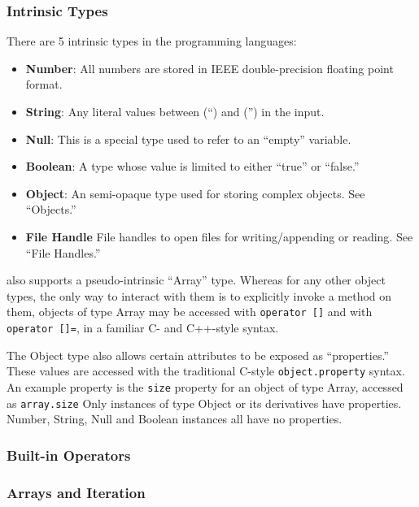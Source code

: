 \subsubsection{Intrinsic Types}

There are 5 intrinsic types in the \ModLang programming languages:

\begin{itemize}
\item \textbf{Number}: All numbers are stored in IEEE double-precision floating point format.
\item \textbf{String}: Any literal values between (``) and ('') in the input.
\item \textbf{Null}: This is a special type used to refer to an ``empty'' variable.
\item \textbf{Boolean}: A type whose value is limited to either ``true'' or ``false.''
\item \textbf{Object}: An semi-opaque type used for storing complex objects. See ``Objects.''
\item \textbf{File Handle} File handles to open files for writing/appending or reading. See ``File Handles.''
\end{itemize}

\ModLang also supports a pseudo-intrinsic ``Array'' type. Whereas for any other
object types, the only way to interact with them is to explicitly invoke a
method on them, objects of type Array may be accessed with {\tt operator []}
and with {\tt operator []=}, in a familiar C- and C++-style syntax.

The Object type also allows certain attributes to be exposed as ``properties.''
These values are accessed with the traditional C-style {\tt object.property}
syntax. An example property is the {\tt size} property for an object of
type Array, accessed as {\tt array.size} Only instances of type Object
or its derivatives have properties. Number, String, Null and Boolean 
instances all have no properties.

\subsubsection{Built-in Operators}

\subsubsection{Arrays and Iteration}

